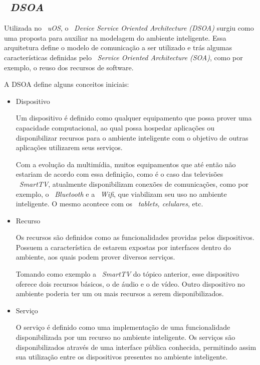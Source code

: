 \subsection{~\emph{DSOA}}
\label{subsec:dsoa}
	
		Utilizada no ~\textit{uOS}, o ~\textit{Device Service Oriented Architecture (DSOA)} surgiu como
		uma proposta para auxiliar na modelagem do ambiente inteligente. Essa arquitetura define o modelo
		de comunicação a ser utilizado e trás algumas características definidas pelo ~\textit{Service
		Oriented Architecture (SOA)}, como por exemplo, o reuso dos recursos de software. 
		
		A DSOA define alguns conceitos iniciais:

		\begin{itemize}
			\item Dispositivo

				Um dispositivo é definido como qualquer equipamento que possa prover uma capacidade 
				computacional, ao qual possa hospedar aplicações ou disponibilizar recursos para o ambiente
				inteligente com o objetivo de outras aplicações utilizarem seus serviços.

				Com a evolução da multimídia, muitos equipamentos que até então não estariam de acordo com essa
				definição, como é o caso das televisões ~\textit{SmartTV}, atualmente disponibilizam conexões de
				comunicações, como por exemplo, o ~\textit{Bluetooth} e a ~\textit{Wifi}, que viabilizam seu
				uso no ambiente inteligente. O mesmo acontece com os ~\textit{tablets, celulares}, etc. 
				
			\item Recurso

				Os recursos são definidos como as funcionalidades providas pelos dispositivos. Possuem a
				característica de estarem expostas por interfaces dentro do ambiente, aos quais podem prover
				diversos serviços.

				Tomando como exemplo a ~\textit{SmartTV} do tópico anterior, esse dispositivo oferece dois
				recursos básicos, o de áudio e o de vídeo. Outro dispositivo no ambiente poderia ter um ou mais
				recursos a serem disponibilizados.

			\item Serviço 
				
				O serviço é definido como uma implementação de uma funcionalidade disponibilizada por um recurso
				no ambiente	inteligente. Os serviços são disponibilizados através de uma interface pública
				conhecida, permitindo assim sua utilização entre os dispositivos presentes no
				ambiente inteligente.
				
		\end{itemize}
		
